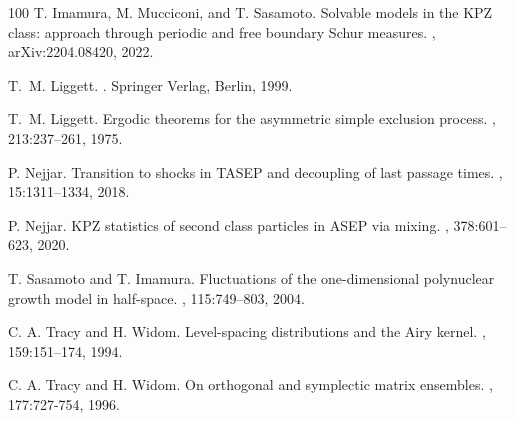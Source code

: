 \documentclass[12pt,a4paper]{amsart}
\theoremstyle{remark}
\numberwithin{equation}{section} \numberwithin{theorem}{section}
\begin{document}
\begin{thebibliography}{100}
T. Imamura, M. Mucciconi, and T. Sasamoto.
\newblock Solvable models in the KPZ class: approach through periodic and free boundary Schur measures.
, arXiv:2204.08420, 2022.

T.~M. Liggett.
.
\newblock Springer Verlag, Berlin, 1999.

T.~M. Liggett.
\newblock Ergodic theorems for the asymmetric simple exclusion process.
, 213:237–261, 1975.

P. Nejjar.
\newblock Transition to shocks in TASEP and decoupling of last passage times.
, 15:1311–1334, 2018.

P. Nejjar.
\newblock KPZ statistics of second class particles in ASEP via mixing.
, 378:601–623, 2020.

T. Sasamoto and T. Imamura.
\newblock Fluctuations of the one-dimensional polynuclear growth model in half-space.
, 115:749–803, 2004.

C. A. Tracy and H. Widom.
\newblock Level-spacing distributions and the Airy kernel.
, 159:151–174, 1994.

C. A. Tracy and H. Widom.
\newblock On orthogonal and symplectic matrix ensembles.
, 177:727-754, 1996.


\end{thebibliography}
\end{document}
